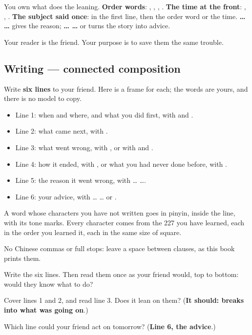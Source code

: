 You own what does the leaning. \textbf{Order words}: , , , . \textbf{The time at the front}: , , . \textbf{The subject said once}:  in the first line, then the order word or the time. \textbf{ …  …} gives the reason; \textbf{ …  …} or \textbf{} turns the story into advice.

Your reader is the friend. Your purpose is to save them the same trouble.

\subsection*{Writing — connected composition}
Write \textbf{six lines} to your friend. Here is a frame for each; the words are yours, and there is no model to copy.

\begin{itemize}
\raggedright
  \item Line 1: when and where, and what you did first, with  and .
  \item Line 2: what came next, with .
  \item Line 3: what went wrong, with , or with  and .
  \item Line 4: how it ended, with , or what you had never done before, with .
  \item Line 5: the reason it went wrong, with  …  ….
  \item Line 6: your advice, with  …  … or .
\end{itemize}

A word whose characters you have not written goes in pinyin, inside the line, with its tone marks. Every character comes from the 227 you have learned, each in the order you learned it, each in the same size of square.

No Chinese commas or full stops: leave a space between clauses, as this book prints them.

Write the six lines. Then read them once as your friend would, top to bottom: would they know what to do?

\begin{tcolorbox}[breakable,colback=teal!4,colframe=teal!35!black,title={Before you move on}]
Cover lines 1 and 2, and read line 3. Does it lean on them? (\textbf{It should:  breaks into what was going on}.)

Which line could your friend act on tomorrow? (\textbf{Line 6, the advice}.)
\end{tcolorbox}
